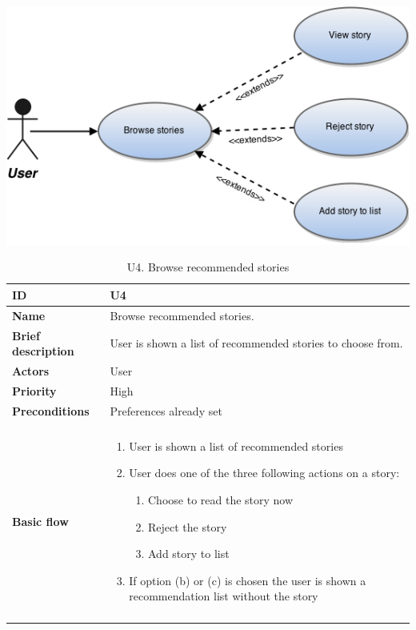 \begin{table}[htp]
	\includegraphics[width=\textwidth]{fig/U4}
	\centering
	\caption{U4. Browse recommended stories}
	\begin{tabular}[b]{|l | l|}\hline
		\textbf{ID} 				& U4									\\\hline
		\textbf{Name} 				& Browse recommended stories.			\\\hline
		\textbf{Brief description}	& User is shown a list of recommended stories to choose from. 		\\\hline
		\textbf{Actors} 			& User									\\\hline
		\textbf{Priority}			& High									\\\hline
		\textbf{Preconditions}		& Preferences already set				\\\hline&\\[-2ex]
		\textbf{Basic flow}			& \begin{minipage}{5in}
			\begin{enumerate}[noitemsep]
				\item User is shown a list of recommended stories
				\item User does one of the three following actions on a story:
					\begin{enumerate}
						\item Choose to read the story now
						\item Reject the story
						\item Add story to list  
					\end{enumerate}
				\item If option (b) or (c) is chosen the user is shown a recommendation list without the story
			\end{enumerate}						
		\end{minipage}						\\\hline&\\[-2ex]

\end{tabular}
\end{table}
